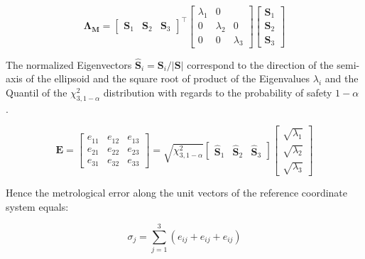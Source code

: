 \documentclass[5p,times,procedia]{elsarticle}
\begin{document}
\begin{equation}
	\mathbf{\Lambda_{M}} =
	\begin{bmatrix}
		\mathbf{S}_1^{} & \mathbf{S}_2^{} & \mathbf{S}_3^{}
	\end{bmatrix}^{\top}
	\begin{bmatrix}
		\lambda_1^{} & 0 \\
		0 & \lambda_2^{} &  0 \\
		0 & 0 &  \lambda_3^{}
	\end{bmatrix}
	\begin{bmatrix}
		\mathbf{S}_1^{} \\
		\mathbf{S}_2^{} \\
		\mathbf{S}_3^{}
	\end{bmatrix}
\end{equation}

The normalized Eigenvectors $\mathbf{\hat{S}}_i = \mathbf{S}_i / |\mathbf{S}|$ correspond to the direction of the semi-axis of the ellipsoid and the square root of product of the Eigenvalues $\lambda_i$ and the Quantil of the $\chi^2_{3,1-\alpha} $ distribution with regards to the probability of safety $1-\alpha$ \cite{Pelzer1995}.


\begin{equation}
	\mathbf{E} =
	\begin{bmatrix}
		e_{11}^{} & e_{12}^{} & e_{13}^{} \\
		e_{21}^{} & e_{22}^{} & e_{23}^{} \\
		e_{31}^{} & e_{32}^{} & e_{33}^{}
	\end{bmatrix}
	=
	\sqrt{ \chi^2_{3,1-\alpha}}
	\begin{bmatrix}
		\mathbf{\hat{S}}_1^{} & \mathbf{\hat{S}}_2^{} & \mathbf{\hat{S}}_3^{}
	\end{bmatrix}
	\begin{bmatrix}
		\sqrt{\lambda_1^{}} \\
		\sqrt{\lambda_2^{}} \\
		\sqrt{\lambda_3^{}}
	\end{bmatrix}
\end{equation}

Hence the metrological error along the unit vectors of the reference coordinate system equals:

\begin{equation}
	\sigma_j = \sum_{j=1}^{3} \left( e_{ij} + e_{ij} + e_{ij}\right)
\end{equation}
\end{document}
